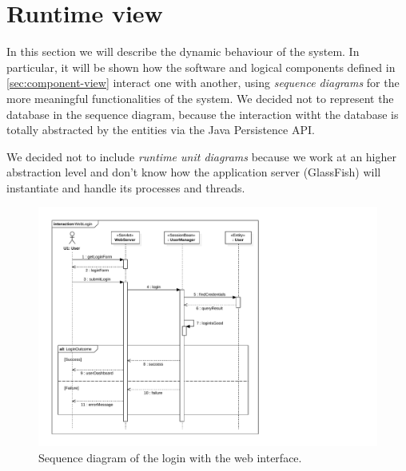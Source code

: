 \section{Runtime view}
\label{sec:runtime-view}

In this section we will describe the dynamic behaviour of the system.
In particular, it will be shown how the software and logical components defined in \autoref{sec:component-view} interact one with another, using \emph{sequence diagrams} for the more meaningful functionalities of the system.
We decided not to represent the database in the sequence diagram, because the interaction witht the database is totally abstracted by the entities via the Java Persistence API.

We decided not to include \emph{runtime unit diagrams} because we work at an higher abstraction level and don't know how the application server (GlassFish) will instantiate and handle its processes and threads.

\begin{figure}[h]
    \centering
    \includegraphics[width=\textwidth]{diagrams/sequence_weblogin}
    \caption{Sequence diagram of the login with the web interface.}
    \label{fig:sequence-weblogin}
\end{figure}

